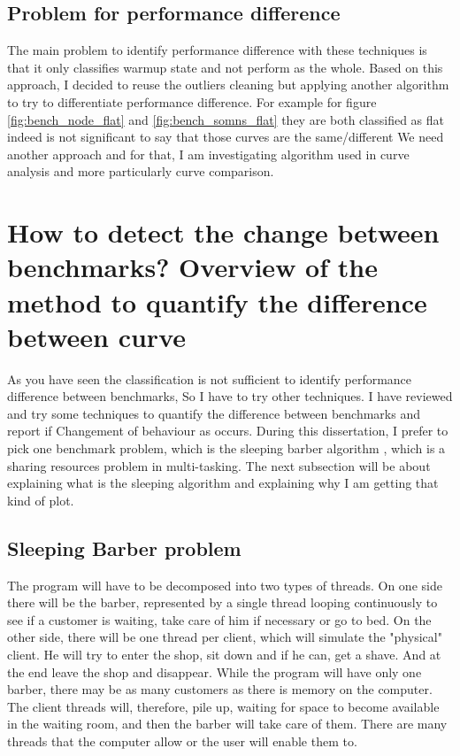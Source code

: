 \documentclass{article}
\begin{document}
\subsection{Problem for performance difference}

The main problem to identify performance difference with these techniques is that it only classifies warmup state and not perform as the whole. Based on this approach, I decided to reuse the outliers cleaning but applying another algorithm to try to differentiate performance difference. For example for figure \ref{fig:bench_node_flat} and \ref{fig:bench_somns_flat} they are both classified as flat indeed is not significant to say that those curves are the same/different We need another approach and for that, I am investigating algorithm used in curve analysis and more particularly curve comparison.




\section{ How to detect the change between benchmarks? Overview of the method to quantify the difference between curve}

As you have seen the classification is not sufficient to identify performance difference between benchmarks, So I have to try other techniques. I have reviewed and try some techniques to quantify the difference between benchmarks and report if Changement of behaviour as occurs. During this dissertation, I prefer to pick one benchmark problem, which is the sleeping barber algorithm \citep{reynolds2002linda}, which is a sharing resources problem in multi-tasking. The next subsection will be about explaining what is the sleeping algorithm and explaining why I am getting that kind of plot.

\subsection{Sleeping Barber problem}

The program will have to be decomposed into two types of threads. On one side there will be the barber, represented by a single thread looping continuously to see if a customer is waiting, take care of him if necessary or go to bed. On the other side, there will be one thread per client, which will simulate the "physical" client. He will try to enter the shop, sit down and if he can, get a shave. And at the end leave the shop and disappear.
While the program will have only one barber, there may be as many customers as there is memory on the computer. The client threads will, therefore, pile up, waiting for space to become available in the waiting room, and then the barber will take care of them. There are many threads that the computer allow or the user will enable them to.
\end{document}
